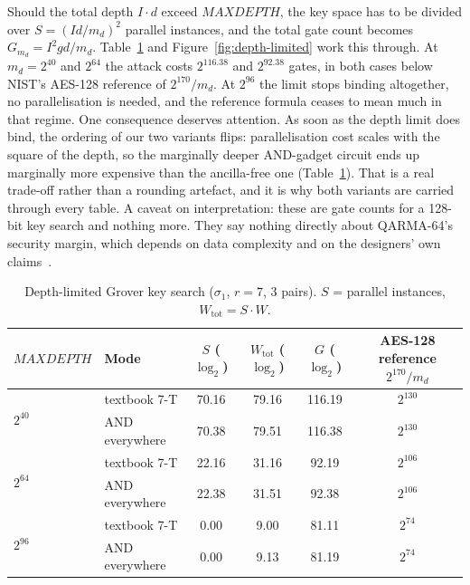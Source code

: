 \documentclass[runningheads,10pt]{llncs}
\begin{document}
Should the total depth $I \cdot d$ exceed $MAXDEPTH$, the key space has to be divided over $S = (Id/m_d)^2$ parallel instances, and the total gate count becomes $G_{m_d} = I^2 g d / m_d$. Table~\ref{tab:depth-limited} and Figure~\ref{fig:depth-limited} work this through. At $m_d = 2^{40}$ and $2^{64}$ the attack costs $2^{116.38}$ and $2^{92.38}$ gates, in both cases below NIST's AES-128 reference of $2^{170}/m_d$. At $2^{96}$ the limit stops binding altogether, no parallelisation is needed, and the reference formula ceases to mean much in that regime. One consequence deserves attention. As soon as the depth limit does bind, the ordering of our two variants flips: parallelisation cost scales with the square of the depth, so the marginally deeper AND-gadget circuit ends up marginally more expensive than the ancilla-free one (Table~\ref{tab:depth-limited}). That is a real trade-off rather than a rounding artefact, and it is why both variants are carried through every table. A caveat on interpretation: these are gate counts for a 128-bit key search and nothing more. They say nothing directly about QARMA-64's security margin, which depends on data complexity and on the designers' own claims~\cite{avanzi2017qarma}.

\begin{table}[htbp]
\centering
\caption{Depth-limited Grover key search ($\sigma_1$, $r=7$, 3 pairs). $S$ = parallel instances, $W_{\mathrm{tot}} = S\cdot W$.}
\label{tab:depth-limited}
\small
\begin{tabular}{llcccc}
\toprule
$MAXDEPTH$ & Mode & $S$ ($\log_2$) & $W_{\mathrm{tot}}$ ($\log_2$) & $G$ ($\log_2$) & AES-128 reference $2^{170}/m_d$ \\
\midrule
\multirow{2}{*}{$2^{40}$} & textbook 7-T & 70.16 & 79.16 & 116.19 & $2^{130}$ \\
 & AND everywhere & 70.38 & 79.51 & 116.38 & $2^{130}$ \\
\multirow{2}{*}{$2^{64}$} & textbook 7-T & 22.16 & 31.16 & 92.19 & $2^{106}$ \\
 & AND everywhere & 22.38 & 31.51 & 92.38 & $2^{106}$ \\
\multirow{2}{*}{$2^{96}$} & textbook 7-T & 0.00 & 9.00 & 81.11 & $2^{74}$ \\
 & AND everywhere & 0.00 & 9.13 & 81.19 & $2^{74}$ \\
\bottomrule
\end{tabular}
\end{table}
\end{document}

